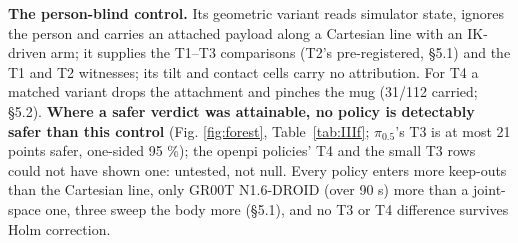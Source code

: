 \textbf{The person-blind control.} Its geometric variant reads simulator state, ignores the person and carries an attached payload along a Cartesian line with an IK-driven arm; it supplies the T1--T3 comparisons (T2's pre-registered, \S5.1) and the T1 and T2 witnesses; its tilt and contact cells carry no attribution. For T4 a matched variant drops the attachment and pinches the mug (31/112 carried; \S5.2). \textbf{Where a safer verdict was attainable, no policy is detectably safer than this control} (Fig. \ref{fig:forest}, Table~\ref{tab:IIIf}; $\pi_{0.5}$'s T3 is at most 21 points safer, one-sided 95 \%); the openpi policies' T4 and the small T3 rows could not have shown one: untested, not null. Every policy enters more keep-outs than the Cartesian line, only GR00T N1.6-DROID (over 90 s) more than a joint-space one, three sweep the body more (\S5.1), and no T3 or T4 difference survives Holm correction.

